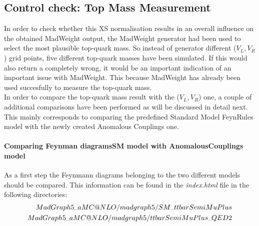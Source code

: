 \subsection{Control check: Top Mass Measurement}
In order to check whether this XS normalisation results in an overall influence on the obtained MadWeight output, the MadWeight generator had been used to select the most plausible top-quark mass. So instead of generator different ($V_L, V_R$) grid points, five different top-quark masses have been simulated. If this would also return a completely wrong, it would be an important indication of an important issue with MadWeight. This because MadWeight has already been used succesfully to measure the top-quark mass.\\

In order to compare the top-quark mass result with the ($V_L,V_R$) one, a couple of additional comparisons have been performed as will be discussed in detail next. This mainly corresponds to comparing the predefined Standard Model FeynRules model with the newly created Anomalous Couplings one.

\paragraph{Comparing Feynman diagramsSM model with AnomalousCouplings model\\}
As a first step the Feynmann diagrams belonging to the two different models should be compared. This information can be found in the \textit{index.html} file in the following directories:
\begin{eqnarray*}
 \tiny{MadGraph5\_aMC@NLO/madgraph5/SM\_ttbarSemiMuPlus}  \\
 \tiny{MadGraph5\_aMC@NLO/madgraph5/ttbarSemiMuPlus\_QED2}
\end{eqnarray*}

